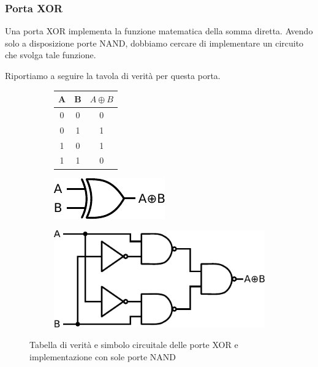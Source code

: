 \subsubsection{Porta XOR}

Una porta XOR implementa la funzione matematica della somma diretta.
Avendo solo a disposizione porte NAND, dobbiamo cercare di implementare un circuito che svolga tale funzione.

Riportiamo a seguire la tavola di verità per questa porta.

\begin{figure}[htpc]
\centering
	\begin{subfigure}[hc]{.4\textwidth}
		\centering
		{\renewcommand{\arraystretch}{1.1}%
		\begin{tabular}{|c|c|c|}
		\hline
		A & B & $A \oplus B$ \\
		\hline
		0 & 0 & 0\\
		\hline
		0 & 1 & 1\\
		\hline
		1 & 0 & 1\\
		\hline
		1 & 1 & 0\\
		\hline
		\end{tabular}}
		\label{tab9:XOR}
        \end{subfigure}
        \begin{subfigure}[hc]{.15\textwidth}
		\centering
		\includegraphics[width=.99\textwidth]{../E09/latex/XOR.pdf}
		\label{cir9:XOR}
	\end{subfigure}
        \begin{subfigure}[hc]{.4\textwidth}
		\centering
		\includegraphics[width=.7\textwidth]{../E09/latex/iXOR.pdf}
		\label{cir9:iXOR}
        \end{subfigure}
\caption{Tabella di verità e simbolo circuitale delle porte XOR e implementazione con sole porte NAND}
\end{figure}

